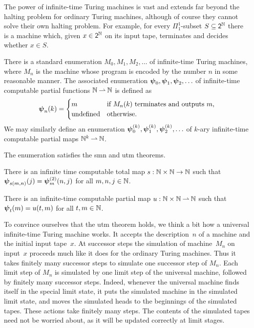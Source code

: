 The power of infinite-time Turing machines is vast and extends far beyond the halting
problem for ordinary Turing machines, although of course they cannot solve their own
halting problem. For example, for every $\Pi^1_1$-subset $S \subseteq \mathsf{2}^{\mathbb{N}}$ there is a machine which, given $x \in \mathsf{2}^{\mathbb{N}}$ on its input tape, terminates and decides whether $x \in S$.

There is a standard enumeration $M_0, M_1, M_2, \ldots$ of infinite-time Turing
machines, where $M_n$ is the machine whose program is encoded by the number $n$
in some reasonable manner. The associated enumeration $\text{\boldmath{$\psi$}}_{0}, \text{\boldmath{$\psi$}}_{1}, \text{\boldmath{$\psi$}}_{2},
\ldots$ of infinite-time computable partial functions $\mathbb{N} \mathbin{\rightharpoonup} \mathbb{N}$ is
defined as
%
\begin{equation*}
  \text{\boldmath{$\psi$}}_{n}(k) =
  \begin{cases}
    m & \text{if $M_n(k)$ terminates and outputs $m$,}\\
    \text{undefined} & \text{otherwise}.
  \end{cases}
\end{equation*}
%
We may similarly define an enumeration $\text{\boldmath{$\psi$}}_{0}^{(k)}, \text{\boldmath{$\psi$}}_{1}^{(k)}, \text{\boldmath{$\psi$}}_{2}^{(k)}, \ldots$ of $k$-ary infinite-time computable partial maps $\mathbb{N}^k \mathbin{\rightharpoonup} \mathbb{N}$.

The enumeration satisfies the smn and utm theorems.

\begin{theorem}
  There is an infinite time computable total map $s : \mathbb{N} \times \mathbb{N} \to \mathbb{N}$
  such that $\text{\boldmath{$\psi$}}_{{s}(m,n)}(j) = \text{\boldmath{$\psi$}}_{m}^{(2)}(n, j)$ for all $m, n, j \in \mathbb{N}$.
\end{theorem}

\begin{theorem}
  There is an infinite-time computable partial map $u : \mathbb{N} \times \mathbb{N} \mathbin{\rightharpoonup}
  \mathbb{N}$ such that $\text{\boldmath{$\psi$}}_{t}(m) = u(t,m)$ for all $t, m \in \mathbb{N}$.
\end{theorem}

\noindent
%
To convince ourselves that the utm theorem holds, we think a bit how a universal
infinite-time Turing machine works. It accepts the description~$n$ of a machine and the
initial input tape~$x$. At successor steps the simulation of machine~$M_n$ on input~$x$
proceeds much like it does for the ordinary Turing machines. Thus it takes finitely many
successor steps to simulate one successor step of $M_n$. Each limit step of $M_n$ is
simulated by one limit step of the universal machine, followed by finitely many successor
steps. Indeed, whenever the universal machine finds itself in the special limit state, it
puts the simulated machine in the simulated limit state, and moves the simulated heads to
the beginnings of the simulated tapes. These actions take finitely many steps. The
contents of the simulated tapes need not be worried about, as it will be updated correctly at limit stages.

